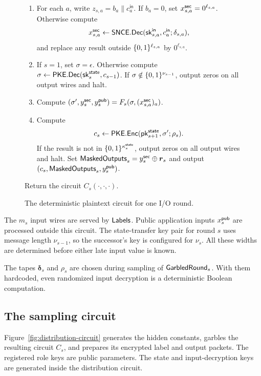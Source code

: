 \begin{figure}[tbp]
{\begin{minipage}{0.95\textwidth}
\begin{description}
    \begin{enumerate}
      \item For each $a$, write $z_{s,a}=b_a\mathbin\|c_a^{\mathsf{in}}$.
        If $b_a=0$, set $x^{\mathsf{sec}}_{s,a}=0^{\ell_{s,a}}$.
        Otherwise compute
        \[
          x^{\mathsf{sec}}_{s,a}\gets\mathsf{SNCE}.\mathsf{Dec}(\mathsf{sk}^{\mathsf{in}}_{s,a},c_a^{\mathsf{in}};\delta_{s,a}),
        \]
        and replace any result outside $\{0,1\}^{\ell_{s,a}}$ by $0^{\ell_{s,a}}$.
      \item If $s=1$, set $\sigma=\epsilon$.
        Otherwise compute $\sigma\gets\mathsf{PKE}.\mathsf{Dec}(\mathsf{sk}^{\mathsf{state}}_s,c_{s-1})$.
        If $\sigma\notin\{0,1\}^{\nu_{s-1}}$, output zeros on all output wires and halt.
      \item Compute $(\sigma',y^{\mathsf{sec}}_s,y^{\mathsf{pub}}_s)=F_s(\sigma,(x^{\mathsf{sec}}_{s,a})_a)$.
      \item Compute
        \[
          c_s\gets\mathsf{PKE}.\mathsf{Enc}(\mathsf{pk}^{\mathsf{state}}_{s+1},\sigma';\rho_s).
        \]
        If the result is not in $\{0,1\}^{\kappa_s^{\mathsf{state}}}$,
        output zeros on all output wires and halt.
        Set $\mathsf{MaskedOutputs}_s=y^{\mathsf{sec}}_s\oplus\boldsymbol r_s$ and output
        $(c_s,\mathsf{MaskedOutputs}_s,y^{\mathsf{pub}}_s)$.
    \end{enumerate}
    Return the circuit $C_s(\cdot,\cdot,\cdot)$.
\end{description}
\end{minipage}}
\caption{The deterministic plaintext circuit for one I/O round.}
\label{fig:round-circuit}
\end{figure}

The $m_s$ input wires are served by $\mathsf{Labels}$.
Public application inputs $x^{\mathsf{pub}}_s$ are processed outside this circuit.
The state-transfer key pair for round $s$ uses message length
$\nu_{s-1}$, so the successor's key is configured for $\nu_s$.
All these widths are determined before either late input value is known.

The tapes $\boldsymbol\delta_s$ and $\rho_s$ are chosen during sampling
of $\mathsf{GarbledRound}_s$.
With them hardcoded, even randomized input decryption is a deterministic
Boolean computation.

\subsection{The sampling circuit}
\label{sec:distribution-circuit}

Figure~\ref{fig:distribution-circuit} generates the hidden constants,
garbles the resulting circuit $C_s$, and prepares its encrypted label and output
packets.  The registered role keys are public parameters.
The state and input-decryption keys are generated inside the
distribution circuit.

